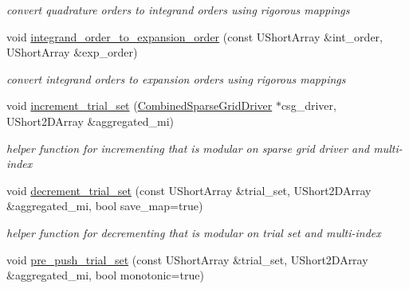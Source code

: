 \begin{DoxyCompactItemize}
\begin{DoxyCompactList}\small\item\em convert quadrature orders to integrand orders using rigorous mappings \end{DoxyCompactList}\item 
void \hyperlink{classPecos_1_1SharedOrthogPolyApproxData_a47a34a4c98da9a11022fba195ff38ccf}{integrand\+\_\+order\+\_\+to\+\_\+expansion\+\_\+order} (const U\+Short\+Array \&int\+\_\+order, U\+Short\+Array \&exp\+\_\+order)\label{classPecos_1_1SharedOrthogPolyApproxData_a47a34a4c98da9a11022fba195ff38ccf}

\begin{DoxyCompactList}\small\item\em convert integrand orders to expansion orders using rigorous mappings \end{DoxyCompactList}\item 
void \hyperlink{classPecos_1_1SharedOrthogPolyApproxData_a85942574b8b40ace2394169985cbfe74}{increment\+\_\+trial\+\_\+set} (\hyperlink{classPecos_1_1CombinedSparseGridDriver}{Combined\+Sparse\+Grid\+Driver} $\ast$csg\+\_\+driver, U\+Short2\+D\+Array \&aggregated\+\_\+mi)\label{classPecos_1_1SharedOrthogPolyApproxData_a85942574b8b40ace2394169985cbfe74}

\begin{DoxyCompactList}\small\item\em helper function for incrementing that is modular on sparse grid driver and multi-\/index \end{DoxyCompactList}\item 
void \hyperlink{classPecos_1_1SharedOrthogPolyApproxData_abf459d5d127a0ced60150bcf3e6cddc2}{decrement\+\_\+trial\+\_\+set} (const U\+Short\+Array \&trial\+\_\+set, U\+Short2\+D\+Array \&aggregated\+\_\+mi, bool save\+\_\+map=true)\label{classPecos_1_1SharedOrthogPolyApproxData_abf459d5d127a0ced60150bcf3e6cddc2}

\begin{DoxyCompactList}\small\item\em helper function for decrementing that is modular on trial set and multi-\/index \end{DoxyCompactList}\item 
void \hyperlink{classPecos_1_1SharedOrthogPolyApproxData_aa48b1769554aaee6d8ecc3b4efcbb12f}{pre\+\_\+push\+\_\+trial\+\_\+set} (const U\+Short\+Array \&trial\+\_\+set, U\+Short2\+D\+Array \&aggregated\+\_\+mi, bool monotonic=true)\label{classPecos_1_1SharedOrthogPolyApproxData_aa48b1769554aaee6d8ecc3b4efcbb12f}


\end{DoxyCompactItemize}
